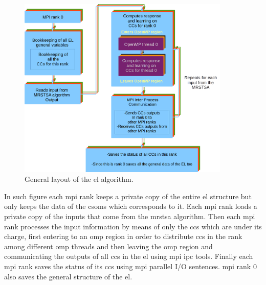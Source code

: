 {\begin{figure}[ht]
    \centering
    \includegraphics[width=0.9\textwidth]{EL_ALG.png}
    \caption{General layout of the \gls{el} algorithm.} 
    \label{fig:EL_ALG}
\end{figure}

In such figure each \gls{mpi} rank keeps a private copy of the entire \gls{el} structure but only keeps the data of the \glspl{csom} which corresponds to it. Each \gls{mpi} rank loads a private copy of the inputs that come from the \gls{mrstsa} algorithm. Then each \gls{mpi} rank processes the input information by means of only the \glspl{cc} which are under its charge, first entering to an \gls{omp} region in order to distribute \glspl{cc} in the rank among different \gls{omp} threads and then leaving the \gls{omp} region and communicating the outputs of all \glspl{cc} in the \gls{el} using \gls{mpi} \gls{ipc} tools. Finally each \gls{mpi} rank saves the status of its \glspl{cc} using \gls{mpi} parallel I/O sentences. \gls{mpi} rank 0 also saves the general structure of the \gls{el}.
}

















